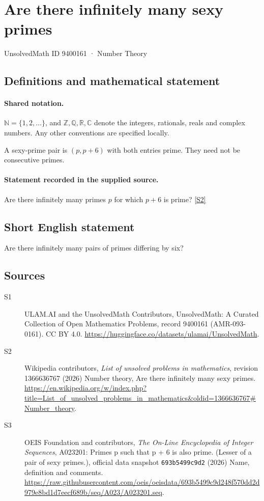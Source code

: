 \documentclass[11pt]{article}
\newcommand{\sref}[2]{\hyperlink{source:#1:#2}{[S#2]}}
\begin{document}
\setcounter{section}{9400160}
\section{Are there infinitely many sexy primes}\label{9400161}
{\small\sffamily UnsolvedMath ID 9400161 · Number Theory}
\subsection{Definitions and mathematical statement}

\paragraph{Shared notation.}$\mathbb N=\{1,2,\ldots\}$, and $\mathbb Z,\mathbb Q,\mathbb R,\mathbb C$ denote the integers, rationals, reals and complex numbers. Any other conventions are specified locally.


A sexy-prime pair is $(p,p+6)$ with both entries prime. They need not be consecutive primes.
\paragraph{Statement recorded in the supplied source.}
Are there infinitely many primes $p$ for which $p+6$ is prime? \sref{9400161}{2}
\subsection{Short English statement}
Are there infinitely many pairs of primes differing by six?
\subsection{Sources}
\begin{description}
\item[\hypertarget{source:9400161:1}{S1}] ULAM.AI and the UnsolvedMath Contributors, UnsolvedMath: A Curated Collection of Open Mathematics Problems, record 9400161 (AMR-093-0161). CC BY 4.0. \url{https://huggingface.co/datasets/ulamai/UnsolvedMath}.
\item[\hypertarget{source:9400161:2}{S2}] Wikipedia contributors, \emph{List of unsolved problems in mathematics}, revision 1366636767 (2026) Number theory, Are there infinitely many sexy primes. \url{https://en.wikipedia.org/w/index.php?title=List_of_unsolved_problems_in_mathematics&oldid=1366636767#Number_theory}.
\item[\hypertarget{source:9400161:3}{S3}] OEIS Foundation and contributors, \emph{The On-Line Encyclopedia of Integer Sequences}, A023201: Primes p such that p + 6 is also prime. (Lesser of a pair of sexy primes.), official data snapshot \texttt{693b5499c9d2} (2026) Name, definition and comments. \url{https://raw.githubusercontent.com/oeis/oeisdata/693b5499c9d248f570dd2d979e8bd1d7eecf689b/seq/A023/A023201.seq}.
\end{description}
\label{end:9400161}
\end{document}
